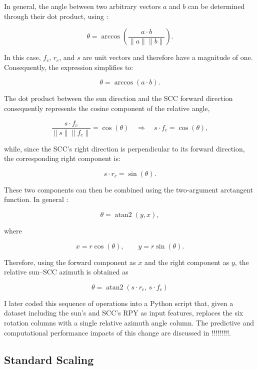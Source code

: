 In general, the angle between two arbitrary vectors \(a\) and \(b\) can be determined through their dot product, using \cite{wikipedia2025dot}:

\[
\theta =
\arccos\left(
\frac{a\cdot b}
{\lVert a\rVert\lVert b\rVert}
\right).
\]

In this case, \(f_c\), \(r_c\), and \(s\) are unit vectors and therefore have a magnitude of one. Consequently, the expression simplifies to:

\[
\theta = \arccos(a\cdot b).
\]

The dot product between the sun direction and the SCC forward direction consequently represents the cosine component of the relative angle,

\[
\frac{s\cdot f_c}
{\lVert s\rVert\lVert f_c\rVert}
=
\cos(\theta)
\quad\Rightarrow\quad
s\cdot f_c = \cos(\theta),
\]

while, since the SCC's right direction is perpendicular to its forward direction, the corresponding right component is:

\[
s\cdot r_c = \sin(\theta).
\]

These two components can then be combined using the two-argument arctangent function. In general \cite{wikipedia2025atan2}:

\[
\theta = \operatorname{atan2}(y,x),
\]

where

\[
x=r\cos(\theta),
\qquad
y=r\sin(\theta).
\]

Therefore, using the forward component as \(x\) and the right component as \(y\), the relative sun–SCC azimuth is obtained as

\begin{equation}
    \theta =
    \operatorname{atan2}
    \left(
    s\cdot r_c,\,
    s\cdot f_c
    \right)
\end{equation}


I later coded this sequence of operations into a Python script that, given a dataset including the sun's and SCC's RPY as input features, replaces the six rotation columns with a single relative azimuth angle column. The predictive and computational performance impacts of this change are discussed in !!!!!!!!!.

\subsection{Standard Scaling}
\label{standscale}


